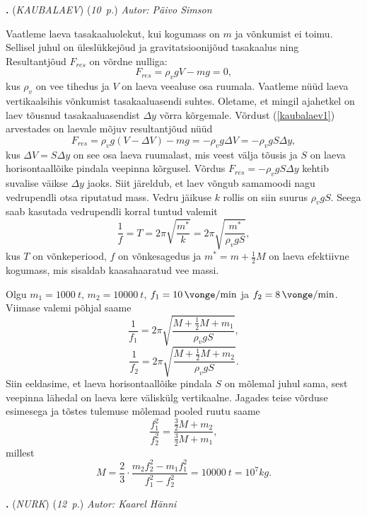\documentclass[11pt,a5paper]{article}
\newcommand{\numb}[1]{\vspace{5pt}\textbf{\large #1}}
\newcommand{\nimi}[1]{(\textsl{\small #1})}
\newcommand{\punktid}[1]{(\emph{#1~p.})}
\newcounter{ylesanne}
\newcommand{\yl}[1]{\addtocounter{ylesanne}{1}\numb{\theylesanne.} \nimi{#1} \newblock{}}
\newcommand{\autor}[1]{\emph{ Autor: #1}}%
\begin{document}
\yl{KAUBALAEV}
\punktid{10} \autor{Päivo Simson}

Vaatleme laeva tasakaaluolekut, kui kogumass on $m$ ja võnkumist ei toimu. Sellisel juhul on üleslükkejõud ja gravitatsioonijõud tasakaalus ning Resultantjõud $F_{res}$ on võrdne nulliga:
\begin{equation}
F_{res}=\rho_vgV-mg=0,
\label{kaubalaev1}
\end{equation}
kus $\rho_v$ on vee tihedus ja $V$ on laeva veealuse osa ruumala. Vaatleme nüüd laeva vertikaalsihis võnkumist tasakaaluasendi suhtes. Oletame, et mingil ajahetkel on laev tõusnud tasakaaluasendist $\Delta y$ võrra kõrgemale. Võrdust (\ref{kaubalaev1}) arvestades on laevale mõjuv resultantjõud nüüd
\[F_{res}=\rho_vg(V-\Delta V)-mg=-\rho_vg\Delta V=-\rho_vgS\Delta y,\]
kus $\Delta V=S\Delta y$ on see osa laeva ruumalast, mis veest välja tõusis ja $S$ on laeva horisontaallõike pindala veepinna kõrgusel. Võrdus $F_{res}=-\rho_vgS\Delta y$ kehtib suvalise väikse $\Delta y$ jaoks. Siit järeldub, et laev võngub samamoodi nagu vedrupendli otsa riputatud mass. Vedru jäikuse $k$ rollis on siin suurus $\rho_vgS$. Seega saab kasutada vedrupendli korral tuntud valemit
\[\frac{1}{f}=T=2\pi\sqrt{\frac{m^*}{k}}=2\pi\sqrt{\frac{m^*}{\rho_vgS}},\]
kus $T$ on võnkeperiood, $f$ on võnkesagedus ja $m^*=m+\frac{1}{2}M$ on laeva efektiivne kogumass, mis sisaldab kaasahaaratud vee massi.

\DeclareSIUnit{}
Olgu $m_1=\SI{1000}{t}$, $m_2=\SI{10000}{t}$, $f_1=\SI{10}{\vonge \per \minute}$ ja $f_2=\SI{8}{\vonge \per \minute}$.
Viimase valemi põhjal saame
\[\frac{1}{f_1}=2\pi\sqrt{\frac{M+\frac{1}{2}M+m_1}{\rho_vgS}},\]
\[\frac{1}{f_2}=2\pi\sqrt{\frac{M+\frac{1}{2}M+m_2}{\rho_vgS}}.\]
Siin eeldasime, et laeva horisontaallõike pindala $S$ on mõlemal juhul sama, sest veepinna lähedal on laeva kere väliskülg vertikaalne.
Jagades teise võrduse esimesega ja tõstes tulemuse mõlemad pooled ruutu saame
\[\frac{f_1^2}{f_2^2}=\frac{\frac{3}{2}M+m_2}{\frac{3}{2}M+m_1},\]
millest
\[M=\frac{2}{3}\cdot\frac{m_2f_2^2-m_1f_1^2}{f_1^2-f_2^2}=\SI{10000}{t}=10^7\si{kg}.\]

\yl{NURK}
\punktid{12} \autor{Kaarel Hänni}
\end{document}
